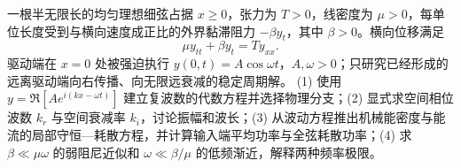 一根半无限长的均匀理想细弦占据 \(x\ge0\)，张力为 \(T>0\)，线密度为 \(\mu>0\)，每单位长度受到与横向速度成正比的外界黏滞阻力 \(-\beta y_t\)，其中 \(\beta>0\)。横向位移满足
\[
\mu y_{tt}+\beta y_t=T y_{xx}.
\]
驱动端在 \(x=0\) 处被强迫执行 \(y(0,t)=A\cos\omega t\)，\(A,\omega>0\)；只研究已经形成的远离驱动端向右传播、向无限远衰减的稳定周期解。
(1) 使用 \(y=\Re[Ae^{i(kx-\omega t)}]\) 建立复波数的代数方程并选择物理分支；(2) 显式求空间相位波数 \(k_r\) 与空间衰减率 \(k_i\)，讨论振幅和波长；(3) 从波动方程推出机械能密度与能流的局部守恒—耗散方程，并计算输入端平均功率与全弦耗散功率；(4) 求 \(\beta\ll\mu\omega\) 的弱阻尼近似和 \(\omega\ll\beta/\mu\) 的低频渐近，解释两种频率极限。
